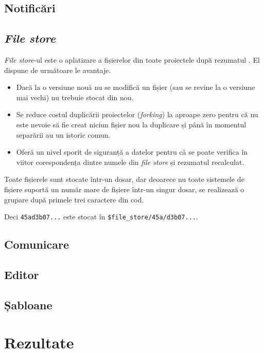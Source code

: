 \documentclass[a4wide,12pt]{report}
\newcommand{\eng}[1]{\emph{#1}} %
\newcommand{\cod}[1]{\texttt{#1}}
\newcommand{\acr}[1]{{\textsmaller[1]{\textsc{#1}}}} %
\begin{document}
\section{Notificări}

\section{\eng{File store}}

\eng{File store}-ul este o aplatizare a fișierelor din toate proiectele după
rezumatul \acr{SHA1}. El dispune de următoare le avantaje.

\begin{itemize}

\item Dacă la o versiune nouă nu se modifică un fișier (sau se revine la o
versiune mai vechi) nu trebuie stocat din nou.

\item Se reduce costul duplicării proiectelor (\eng{forking}) la aproape zero
pentru că nu este nevoie să fie creat niciun fișier nou la duplicare și până în
momentul separării au un istoric comun.

\item Oferă un nivel sporit de siguranță a datelor pentru că se poate verifica
în viitor corespondența dintre numele din \eng{file store} și rezumatul
\acr{SHA1} recalculat.

\end{itemize}

Toate fișierele sunt stocate într-un dosar, dar deoarece nu toate sistemele de
fișiere suportă un număr mare de fișiere într-un singur dosar, se realizează o
grupare după primele trei caractere din cod.

Deci \cod{45ad3b07...} este stocat în \cod{\$file\_store/45a/d3b07...}.

\section{Comunicare}

\section{Editor}

\section{Șabloane}
\label{sabloanesec}

\chapter{Rezultate}
\end{document}
